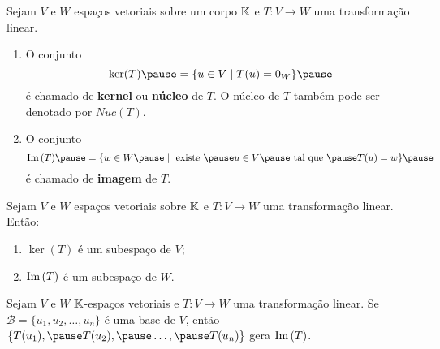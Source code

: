 \documentclass{beamer}
\begin{document}
    \begin{frame}
        \begin{definicao}
            Sejam $V$ e $W$ espaços vetoriais sobre um corpo $\mathbb{K}$ \pause e $T \colon V \to W$ uma transformação linear.\pause
            \begin{enumerate}[label={\roman*})]
                \vspace*{.25cm}
                \item O conjunto\pause
                \[
                    \ker(T) \pause = \{u \in V  \mid T(u) = 0_W\}\pause
                \]
                é chamado de \textbf{kernel} \pause ou \textbf{núcleo} de $T$. \pause O núcleo de $T$ também pode ser denotado por
                $Nuc(T)$.\pause

                \vspace*{1cm}

                \item O conjunto\pause
                \[
                    \im(T)\pause = \{w \in W \pause \mid \mbox{ existe } \pause u \in V \pause \mbox{ tal que } \pause T(u) = w\}\pause
                \]
                é chamado de \textbf{imagem} de $T$.
            \end{enumerate}
        \end{definicao}
    \end{frame}

    \begin{frame}

        \begin{proposicao}
            Sejam $V$ e $W$ espaços vetoriais sobre $\mathbb{K}$ \pause e $T \colon V \to W$ uma transformação linear. \pause Então:
            \begin{enumerate}[label={\roman*})]
                \vspace*{.25cm}
                \item $\ker(T)$ \pause é um subespaço de $V$;\pause

                \vspace*{1cm}

                \item ${\rm Im\,}(T)$ \pause é um subespaço de $W$.
            \end{enumerate}
        \end{proposicao}
    \end{frame}

    \begin{frame}
        \begin{lema}\label{transformacao_gera_imagem}
            Sejam $V$ e $W$ $\mathbb{K}$-espaços vetoriais \pause e $T \colon V \to W$ uma transformação linear. \pause
            Se $\mathcal{B} = \{u_1, u_2, \dots, u_n\}$ é uma base de $V$, \pause então $\{T(u_1), \pause T(u_2), \pause \dots,
            \pause T(u_n)\}$ \pause gera ${\rm Im\,}(T)$.
        \end{lema}
    \end{frame}
\end{document}
